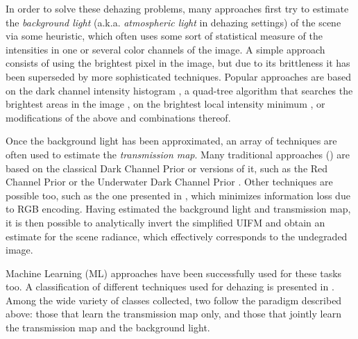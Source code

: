 \documentclass[twocolumn,twoside,a4paper,10pt]{IEEEtran}
\begin{document}
In order to solve these dehazing problems, many approaches first try to estimate the \textit{background light} (a.k.a. \textit{atmospheric light} in dehazing settings) of the scene via some
heuristic, which often uses some sort of statistical measure of the intensities
in one or several color channels of the image. A simple approach consists of using the brightest pixel in the image, but due to its brittleness it has been superseded by more sophisticated techniques. Popular approaches are based
on the dark channel intensity histogram \cite{5567108}, a quad-tree algorithm that searches the brightest areas in
the image \cite{xie2021variational,kim2013optimized,li2016underwater}, on the brightest local intensity minimum \cite{6104148}, or modifications of the above and combinations thereof.

Once the background light has been approximated, an array of techniques are often used to estimate the \textit{transmission map}. Many traditional approaches (\cite{xie2021variational,GALDRAN2015132,Drews_2013_ICCV_Workshops}) are based on the classical Dark Channel Prior \cite{5567108} or versions of it, such as the Red Channel Prior \cite{GALDRAN2015132} or the Underwater Dark Channel Prior \cite{Drews_2013_ICCV_Workshops}. Other
techniques are possible too, such as the one presented in \cite{7574330}, which
minimizes information loss due to RGB encoding. Having estimated the background light and transmission map, it is then possible to analytically invert the simplified UIFM
and obtain an estimate for the scene radiance, which effectively corresponds to
the undegraded image.

Machine Learning (ML) approaches have been successfully used for these tasks too. A classification of different techniques used for dehazing is presented in \cite{10.1145/3576918}. Among the wide variety of classes collected, two follow the paradigm described above: those that learn the transmission map only, and those that jointly learn the transmission map and the background light.
\end{document}
